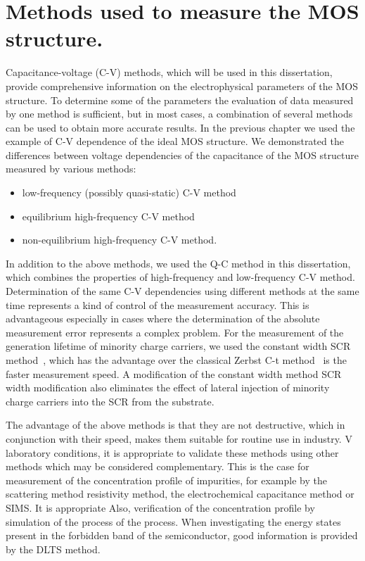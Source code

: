 
\chapter{Methods used to measure the MOS structure.}%
\label{Chapter3}%


Capacitance-voltage (C-V) methods, which will be used in this
dissertation, provide comprehensive information on the electrophysical
parameters of the MOS structure. To determine some of the parameters
the evaluation of data measured by one method is sufficient, but in
most cases, a combination of several methods can be used to obtain
more accurate results. In the previous chapter we used the example of
C-V dependence of the ideal MOS structure. We demonstrated the
differences between voltage dependencies of the capacitance of the MOS
structure measured by various methods:

\begin{itemize}
\item low-frequency (possibly quasi-static) C-V method
\item equilibrium high-frequency C-V method
\item non-equilibrium high-frequency C-V method.
\end{itemize}

In addition to the above methods, we used the Q-C method in this
dissertation, which combines the properties of high-frequency and
low-frequency C-V method. Determination of the same C-V dependencies
using different methods at the same time represents a kind of control
of the measurement accuracy.  This is advantageous especially in cases
where the determination of the absolute measurement error represents a
complex problem. For the measurement of the generation lifetime of
minority charge carriers, we used the constant width SCR
method~\cite{3.1}, which has the advantage over the classical Zerbst
C-t method~\cite{3.2} is the faster measurement speed. A modification
of the constant width method SCR~\cite{3.3} width modification also
eliminates the effect of lateral injection of minority charge carriers
into the SCR from the substrate.

The advantage of the above methods is that they are not destructive,
which in conjunction with their speed, makes them suitable for routine
use in industry.  V laboratory conditions, it is appropriate to
validate these methods using other methods which may be considered
complementary. This is the case for measurement of the concentration
profile of impurities, for example by the scattering method
resistivity method, the electrochemical capacitance method or
SIMS\@. It is appropriate Also, verification of the concentration
profile by simulation of the process of the process. When
investigating the energy states present in the forbidden band of the
semiconductor, good information is provided by the DLTS method.

